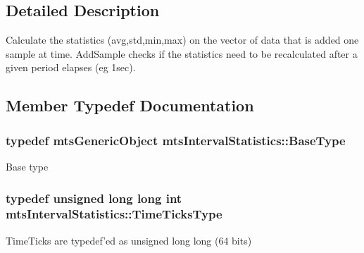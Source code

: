 \subsection{Detailed Description}
Calculate the statistics (avg,std,min,max) on the vector of data that is added one sample at time. Add\-Sample checks if the statistics need to be recalculated after a given period elapses (eg 1sec). 

\subsection{Member Typedef Documentation}
\hypertarget{classmts_interval_statistics_af698a08da830735b7cda531c4089ac04}{
\subsubsection[{Base\-Type}]{\setlength{\rightskip}{0pt plus 5cm}typedef {\bf mts\-Generic\-Object} {\bf mts\-Interval\-Statistics\-::\-Base\-Type}}}\label{classmts_interval_statistics_af698a08da830735b7cda531c4089ac04}
Base type \hypertarget{classmts_interval_statistics_a7cd13b925ee829840466b17fb3051075}{
\subsubsection[{Time\-Ticks\-Type}]{\setlength{\rightskip}{0pt plus 5cm}typedef unsigned long long int {\bf mts\-Interval\-Statistics\-::\-Time\-Ticks\-Type}}}\label{classmts_interval_statistics_a7cd13b925ee829840466b17fb3051075}
Time\-Ticks are typedef'ed as unsigned long long (64 bits) 


